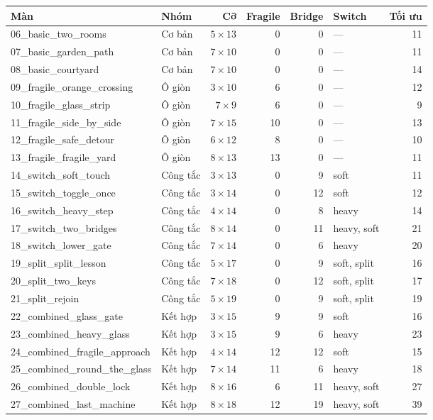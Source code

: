 \begin{tabular}{llrrrlr}
\hline
Màn & Nhóm & Cỡ & Fragile & Bridge & Switch & Tối ưu \\
\hline
06\_basic\_two\_rooms & Cơ bản & $5 \times 13$ & 0 & 0 & --- & 11 \\
07\_basic\_garden\_path & Cơ bản & $7 \times 10$ & 0 & 0 & --- & 11 \\
08\_basic\_courtyard & Cơ bản & $7 \times 10$ & 0 & 0 & --- & 14 \\
09\_fragile\_orange\_crossing & Ô giòn & $3 \times 10$ & 6 & 0 & --- & 12 \\
10\_fragile\_glass\_strip & Ô giòn & $7 \times 9$ & 6 & 0 & --- & 9 \\
11\_fragile\_side\_by\_side & Ô giòn & $7 \times 15$ & 10 & 0 & --- & 13 \\
12\_fragile\_safe\_detour & Ô giòn & $6 \times 12$ & 8 & 0 & --- & 10 \\
13\_fragile\_fragile\_yard & Ô giòn & $8 \times 13$ & 13 & 0 & --- & 11 \\
14\_switch\_soft\_touch & Công tắc & $3 \times 13$ & 0 & 9 & soft & 11 \\
15\_switch\_toggle\_once & Công tắc & $3 \times 14$ & 0 & 12 & soft & 12 \\
16\_switch\_heavy\_step & Công tắc & $4 \times 14$ & 0 & 8 & heavy & 14 \\
17\_switch\_two\_bridges & Công tắc & $8 \times 14$ & 0 & 11 & heavy, soft & 21 \\
18\_switch\_lower\_gate & Công tắc & $7 \times 14$ & 0 & 6 & heavy & 20 \\
19\_split\_split\_lesson & Công tắc & $5 \times 17$ & 0 & 9 & soft, split & 16 \\
20\_split\_two\_keys & Công tắc & $7 \times 18$ & 0 & 12 & soft, split & 17 \\
21\_split\_rejoin & Công tắc & $5 \times 19$ & 0 & 9 & soft, split & 19 \\
22\_combined\_glass\_gate & Kết hợp & $3 \times 15$ & 9 & 9 & soft & 16 \\
23\_combined\_heavy\_glass & Kết hợp & $3 \times 15$ & 9 & 6 & heavy & 23 \\
24\_combined\_fragile\_approach & Kết hợp & $4 \times 14$ & 12 & 12 & soft & 15 \\
25\_combined\_round\_the\_glass & Kết hợp & $7 \times 14$ & 11 & 6 & heavy & 18 \\
26\_combined\_double\_lock & Kết hợp & $8 \times 16$ & 6 & 11 & heavy, soft & 27 \\
27\_combined\_last\_machine & Kết hợp & $8 \times 18$ & 12 & 19 & heavy, soft & 39 \\
\hline
\end{tabular}
